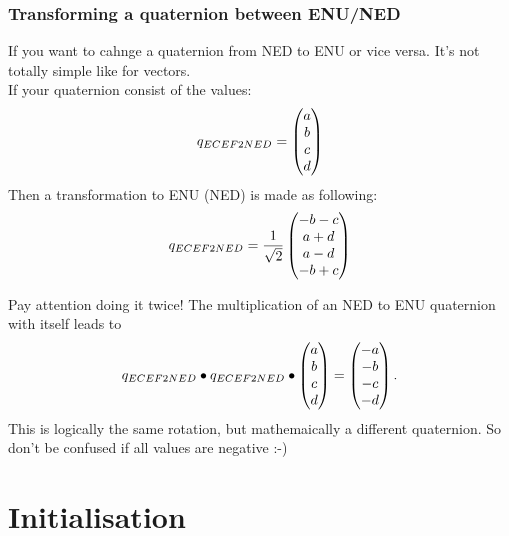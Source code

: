 \subsubsection*{Transforming a quaternion between ENU/NED}
If you want to cahnge a quaternion from NED to ENU or vice versa. It's not totally simple like for vectors. \\
If your quaternion consist of the values:
\begin{equation}
q_{ECEF2NED} = \begin{pmatrix}a \\ b \\ c\\d\end{pmatrix}
\end{equation}
Then a transformation to ENU (NED) is made as following:
\begin{equation}
q_{ECEF2NED} = \frac{1}{\sqrt 2} \begin{pmatrix}-b-c \\ a+d \\ a-d\\-b+c\end{pmatrix}
\end{equation}

Pay attention doing it twice! The multiplication of an NED to ENU quaternion with itself leads to
\begin{equation}
q_{ECEF2NED} \bullet q_{ECEF2NED} \bullet \begin{pmatrix}a \\ b \\ c\\d\end{pmatrix}= \begin{pmatrix}-a \\ -b \\ -c\\-d\end{pmatrix} .
\end{equation}
This is logically the same rotation, but mathemaically a different quaternion. So don't be confused if all values are negative :-)

\section{Initialisation}

